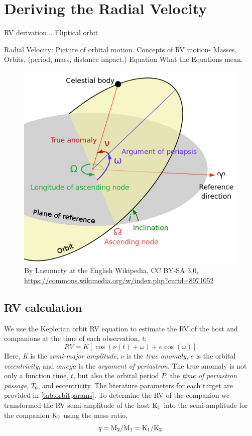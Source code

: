 

\section{Deriving the Radial Velocity}

RV derivation...
Eliptical orbit



Radial Velocity:
Picture of orbital motion.
Concepts of {RV} motion-
Masses,
Orbits, (period, mass, distance impact.)
Equation
What the Equations mean.
\begin{figure}
    \centering
    \includegraphics[width=0.5\linewidth]{figures/advanced_material/orbit}
    \caption{By Lasunncty at the English Wikipedia, CC BY-SA 3.0, \href{https://commons.wikimedia.org/w/index.php?curid=8971052}{https://commons.wikimedia.org/w/index.php?curid=8971052}}
    \label{fig:orbit}
\end{figure}


\subsection{{RV} calculation}
We use the Keplerian orbit {RV} equation to estimate the {RV} of the host and companions at the time of each observation, \(t\):
\begin{equation}
\label{eq:rv_equation}
{RV} = K [\cos{(\nu(t) + \omega)} + e\cos{(\omega)}]
\end{equation}
Here, \emph{K} is the \emph{semi-major amplitude}, \(\nu\) is the \emph{true anomaly}, \(e\) is the orbital \emph{eccentricity}, and \(omega\) is the \emph{argument of periastron}.
The true anomaly is not only a function time, \(t\), but also the orbital period \(P\), the \emph{time of periastron passage}, \(T_0\), and eccentricity.
The literature parameters for each target are provided in \cref{tab:orbitparams}.
To determine the {RV} of the companion we transformed the {RV} semi-amplitude of the host \(\textrm{K}_{1}\) into the semi-amplitude for the companion \(\textrm{K}_{2}\) using the mass ratio,
\begin{equation}
\label{eqn:mass_ratio}
q = \textrm{M}_{2} / \textrm{M}_{1} = \textrm{K}_{1} / \textrm{K}_{2}
\end{equation}

